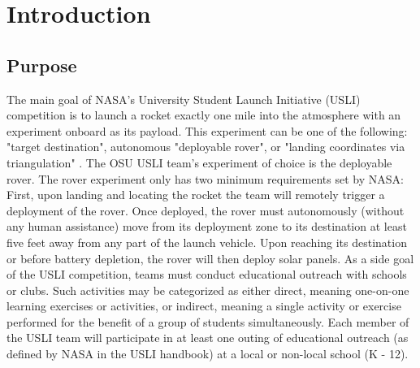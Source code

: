 \documentclass[onecolumn, draftclsnofoot,10pt, compsoc]{IEEEtran}
\begin{document}
\section{Introduction}
\subsection{Purpose}
The main goal of NASA's University Student Launch Initiative (USLI) competition is to launch a rocket exactly one mile into the atmosphere with an experiment onboard as its payload. This experiment can be one of the following: "target destination", autonomous "deployable rover", or "landing coordinates via triangulation" \cite{USLI_handbook}. The OSU USLI team's experiment of choice is the deployable rover. The rover experiment only has two minimum requirements set by NASA: First, upon landing and locating the rocket the team will remotely trigger a deployment of the rover. Once deployed, the rover must autonomously (without any human assistance) move from its deployment zone to its destination at least five feet away from any part of the launch vehicle. Upon reaching its destination or before battery depletion, the rover will then deploy solar panels. As a side goal of the USLI competition, teams must conduct educational outreach with schools or clubs. Such activities may be categorized as either direct, meaning one-on-one learning exercises or activities, or indirect, meaning a single activity or exercise performed for the benefit of a group of students simultaneously. Each member of the USLI team will participate in at least one outing of educational outreach (as defined by NASA in the USLI handbook) at a local or non-local school (K - 12).
\end{document}

